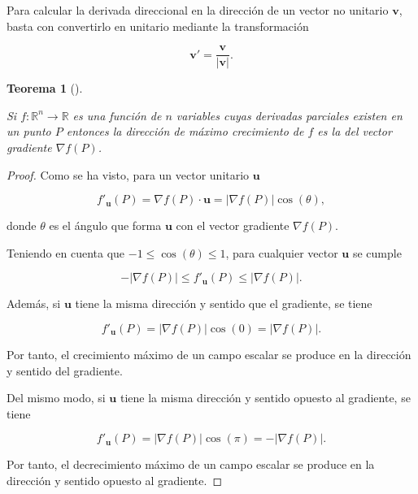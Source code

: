 \documentclass[
  a4paper,
]{scrreport}
\theoremstyle{plain}
\theoremstyle{plain}
\newtheorem{theorem}{Teorema}[chapter]
\theoremstyle{definition}
\theoremstyle{definition}
\theoremstyle{plain}
\theoremstyle{definition}
\theoremstyle{remark}
\begin{document}
Para calcular la derivada direccional en la dirección de un vector no
unitario \(\mathbf{v}\), basta con convertirlo en unitario mediante la
transformación

\[
\mathbf{v'}=\frac{\mathbf{v}}{|\mathbf{v}|}.
\]

\begin{theorem}[]\protect\hypertarget{thm-gradiente-direccion-maximo-crecimiento}{}\label{thm-gradiente-direccion-maximo-crecimiento}

Si \(f:\mathbb{R}^n\rightarrow \mathbb{R}\) es una función de \(n\)
variables cuyas derivadas parciales existen en un punto \(P\) entonces
la dirección de máximo crecimiento de \(f\) es la del vector gradiente
\(\nabla f(P)\).

\end{theorem}

\begin{tcolorbox}[enhanced jigsaw, rightrule=.15mm, toptitle=1mm, colbacktitle=quarto-callout-note-color!10!white, bottomrule=.15mm, opacityback=0, arc=.35mm, breakable, toprule=.15mm, left=2mm, coltitle=black, colback=white, opacitybacktitle=0.6, titlerule=0mm, colframe=quarto-callout-note-color-frame, bottomtitle=1mm, title=\textcolor{quarto-callout-note-color}{\faInfo}\hspace{0.5em}{Demostración}, leftrule=.75mm]

\begin{proof}

Como se ha visto, para un vector unitario \(\mathbf{u}\)

\[
f'_{\mathbf{u}}(P) = \nabla f(P)\cdot \mathbf{u} = |\nabla f(P)|\cos(\theta),
\]

donde \(\theta\) es el ángulo que forma \(\mathbf{u}\) con el vector
gradiente \(\nabla f(P)\).

Teniendo en cuenta que \(-1\leq \cos(\theta)\leq 1\), para cualquier
vector \(\mathbf{u}\) se cumple

\[
-|\nabla f(P)|\leq f'_{\mathbf{u}}(P)\leq |\nabla f(P)|.
\]

Además, si \(\mathbf{u}\) tiene la misma dirección y sentido que el
gradiente, se tiene

\[
f'_{\mathbf{u}}(P)=|\nabla f(P)| \cos(0)= |\nabla f(P)|.
\]

Por tanto, el crecimiento máximo de un campo escalar se produce en la
dirección y sentido del gradiente.

Del mismo modo, si \(\mathbf{u}\) tiene la misma dirección y sentido
opuesto al gradiente, se tiene

\[
f'_{\mathbf{u}}(P)=|\nabla f(P)| \cos(\pi)=-|\nabla f(P)|.
\]

Por tanto, el decrecimiento máximo de un campo escalar se produce en la
dirección y sentido opuesto al gradiente.

\end{proof}

\end{tcolorbox}
\end{document}
